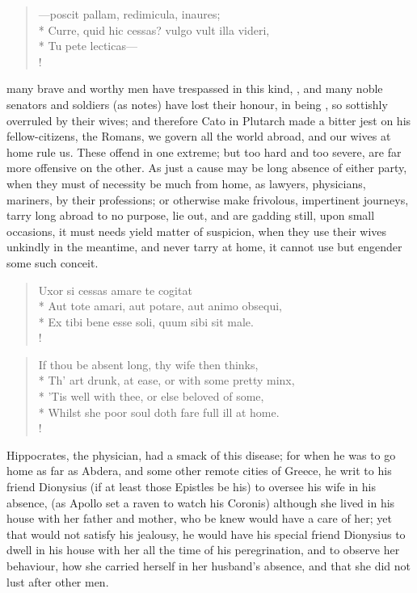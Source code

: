 \begin{latin}
\begin{verse}%
---poscit pallam, redimicula, inaures;\\*
Curre, quid hic cessas? vulgo vult illa videri,\\*
Tu pete lecticas---\\!
\end{verse}%
\end{latin}
%
%
many brave and worthy men have trespassed in this kind, , and many noble senators and
soldiers (as \Pliny{} notes) have lost their honour, in being
, so sottishly overruled by their wives; and therefore Cato in
Plutarch made a bitter jest on his fellow-citizens, the Romans, we
govern all the world abroad, and our wives at home rule us. These
offend in one extreme; but too hard and too severe, are far more
offensive on the other. As just a cause may be long absence of either
party, when they must of necessity be much from home, as lawyers,
physicians, mariners, by their professions; or otherwise make
frivolous, impertinent journeys, tarry long abroad to no purpose, lie
out, and are gadding still, upon small occasions, it must needs yield
matter of suspicion, when they use their wives unkindly in the
meantime, and never tarry at home, it cannot use but engender some such
conceit.
%
\begin{latin}
\begin{verse}%
Uxor si cessas amare te cogitat\\*
Aut tote amari, aut potare, aut animo obsequi,\\*
Ex tibi bene esse soli, quum sibi sit male.\\!
\end{verse}%
\end{latin}
%
%
\begin{verse}%
If thou be absent long, thy wife then thinks,\\*
Th' art drunk, at ease, or with some pretty minx,\\*
'Tis well with thee, or else beloved of some,\\*
Whilst she poor soul doth fare full ill at home.\\!
\end{verse}%

Hippocrates, the physician, had a smack of this disease; for when he
was to go home as far as Abdera, and some other remote cities of
Greece, he writ to his friend Dionysius (if at least those
Epistles be his)  to oversee his wife in his absence, (as
Apollo set a raven to watch his Coronis) although she lived in his
house with her father and mother, who be knew would have a care of her;
yet that would not satisfy his jealousy, he would have his special
friend Dionysius to dwell in his house with her all the time of his
peregrination, and to observe her behaviour, how she carried herself in
her husband's absence, and that she did not lust after other men.

